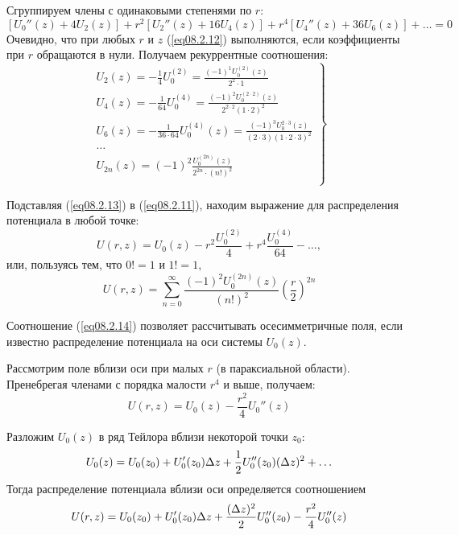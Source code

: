 Сгруппируем члены с одинаковыми степенями по \( r \):
\begin{equation}
	\left[ U_0''(z) + 4U_2(z) \right] + r^2\left[ U_2''(z) + 16U_4(z)\right] + 
		r^4\left[ U_4''(z) + 36U_6(z) \right] + \ldots = 0
	\label{eq08.2.12}
\end{equation}
Очевидно, что при любых \( r \) и \( z \) (\ref{eq08.2.12}) выполняются, если 
коэффициенты при \( r \) обращаются в нули. Получаем рекуррентные соотношения:
\begin{equation}
	\left. \begin{array}{c}
		U_2(z) = -\frac{1}{4}U_0^{(2)} = \frac{(-1)^1 U_0^{(2)}(z)}{2^2\cdot1} \\
		U_4(z) = -\frac{1}{64}U_0^{(4)} = 
			\frac{(-1)^2 U_0^{(2\cdot2)}(z)}{2^{2\cdot2}(1\cdot2)^2} \\
		U_6(z) = -\frac{1}{36\cdot64}U_0^{(4)}(z) = 
			\frac{(-1)^3 U_0^{2\cdot3}(z)}{(2\cdot3)(1\cdot2\cdot3)^2} \\
		\ldots \\
		U_{2n}(z) = (-1)^2\frac{U_0^{(2n)}(z)}{2^{2n}\cdot(n!)^2} \\
	\end{array} \right\}
	\label{eq08.2.13}
\end{equation}

Подставляя (\ref{eq08.2.13}) в (\ref{eq08.2.11}), находим выражение для 
распределения потенциала в любой точке: 
\[
	U(r,z) = U_0(z) - r^2 \frac{U_0^{(2)}}{4} + r^4 \frac{U_0^{(4)}}{64} - 
		\ldots,
\]
или, пользуясь тем, что \( 0! = 1 \) и \( 1! = 1 \), 
\begin{equation}
	U(r,z) = \sum\limits_{n=0}^{\infty}\frac{(-1)^2U_0^{(2n)}(z)}{(n!)^2}
		\left( \frac{r}{2} \right)^{2n}
	\label{eq08.2.14}
\end{equation}

Соотношение (\ref{eq08.2.14}) позволяет рассчитывать осесимметричные поля, 
если известно распределение потенциала на оси системы \( U_0(z) \).

Рассмотрим поле вблизи оси при малых \( r \) (в параксиальной области). 
Пренебрегая членами с порядка малости \( r^4 \) и выше, получаем:
\begin{equation}
	U(r,z) = U_0(z) - \frac{r^2}{4}U_0''(z)
	\label{eq08.2.15}
\end{equation}

Разложим \( U_0(z) \) в ряд Тейлора вблизи некоторой точки \( z_0 \):
\[
	U_0(z) = U_0(z_0) + U_0'(z_0)\Delta z + \frac{1}{2}U_0''(z_0)(\Delta z)^2 + \ldots
\]
Тогда распределение потенциала вблизи оси определяется соотношением
\begin{equation}
	U(r,z) = U_0(z_0) + U_0'(z_0)\Delta z + \frac{(\Delta z)^2}{2} U_0''(z_0) - 
		\frac{r^2}{4}U_0''(z)
	\label{eq08.2.16}
\end{equation}